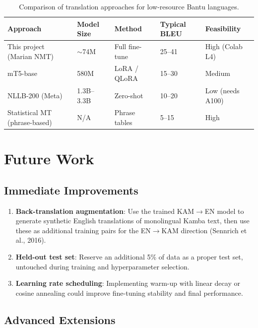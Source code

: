 \documentclass[12pt,a4paper]{article}
\begin{document}
\begin{table}[H]
\centering
\small
\begin{tabular}{@{}p{3.5cm}p{2.5cm}p{2.5cm}p{2cm}p{2cm}@{}}
\toprule
\textbf{Approach} & \textbf{Model Size} & \textbf{Method} & \textbf{Typical BLEU} & \textbf{Feasibility} \\
\midrule
This project (Marian NMT) & $\sim$74M & Full fine-tune & 25--41 & High (Colab L4) \\[3pt]
mT5-base & 580M & LoRA / QLoRA & 15--30 & Medium \\[3pt]
NLLB-200 (Meta) & 1.3B--3.3B & Zero-shot & 10--20 & Low (needs A100) \\[3pt]
Statistical MT (phrase-based) & N/A & Phrase tables & 5--15 & High \\
\bottomrule
\end{tabular}
\caption{Comparison of translation approaches for low-resource Bantu languages.}
\end{table}

\section{Future Work}

\subsection{Immediate Improvements}

\begin{enumerate}
    \item \textbf{Back-translation augmentation}: Use the trained KAM$\rightarrow$EN model to generate synthetic English translations of monolingual Kamba text, then use these as additional training pairs for the EN$\rightarrow$KAM direction (Sennrich et al., 2016).
    
    \item \textbf{Held-out test set}: Reserve an additional 5\% of data as a proper test set, untouched during training and hyperparameter selection.
    
    \item \textbf{Learning rate scheduling}: Implementing warm-up with linear decay or cosine annealing could improve fine-tuning stability and final performance.
\end{enumerate}

\subsection{Advanced Extensions}
\end{document}

